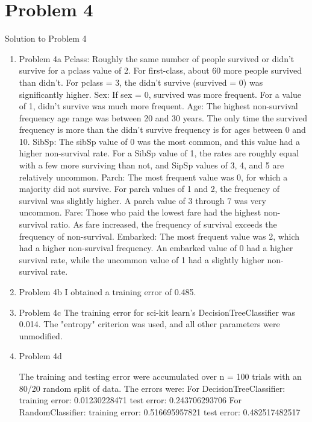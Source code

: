 \documentclass[11pt]{article}
\newcommand{\solution}[1]{{{\color{blue}{\bf Solution:} {#1}}}}
\begin{document}
\section{Problem 4}
\solution{Solution to Problem 4}
\begin{enumerate}
\item Problem 4a
\solution{ \newline{}
Pclass: Roughly the same number of people survived or didn't survive for a pclass value of 2. For first-class, about 60 more people survived than didn't. For pclass = 3, the didn't survive (survived = 0) was significantly higher. 
\newline{}
Sex: If sex = 0, survived was more frequent. For a value of 1, didn't survive was much more frequent. 
\newline{}
Age: The highest non-survival frequency age range was between 20 and 30 years. The only time the survived frequency is more than the didn't survive frequency is for ages between 0 and 10. 
\newline{}
SibSp: The sibSp value of 0 was the most common, and this value had a higher non-survival rate. For a SibSp value of 1, the rates are roughly equal with a few more surviving than not, and SipSp values of 3, 4, and 5 are relatively uncommon. 
\newline{}
Parch: The most frequent value was 0, for which a majority did not survive. For parch values of 1 and 2, the frequency of survival was slightly higher. A parch value of 3 through 7 was very uncommon. 
\newline{}
Fare: Those who paid the lowest fare had the highest non-survival ratio. As fare increased, the frequency of survival exceeds the frequency of non-survival. 
\newline{}
Embarked: The most frequent value was 2, which had a higher non-survival frequency. An embarked value of 0 had a higher survival rate, while the uncommon value of 1 had a slightly higher non-survival rate. 
}
\item Problem 4b
\solution{
I obtained a training error of 0.485.
}
\item Problem 4c
\solution{
The training error for sci-kit learn's DecisionTreeClassifier was 0.014. The "entropy" criterion was used, and all other parameters were unmodified.
}
\item Problem 4d
\solution{
The training and testing error were accumulated over n = 100 trials with an 80/20 random split of data. The errors were:
\newline{}
For DecisionTreeClassifier:
training error: 0.01230228471 \newline{}
test error: 0.243706293706
\newline{}
For RandomClassifier:
training error: 0.516695957821 \newline{}
test error: 0.482517482517

}
\end{enumerate}
\end{document}
